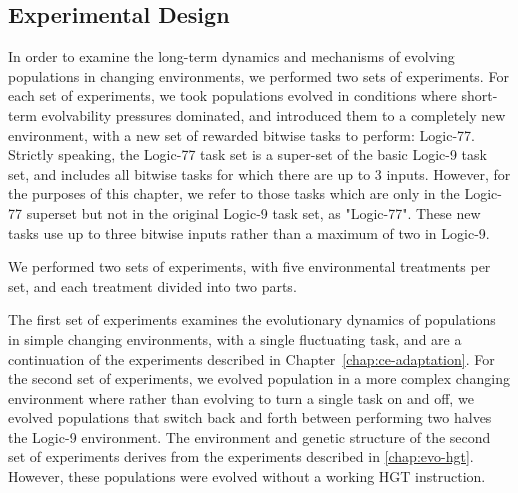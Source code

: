 \documentclass[PhD]{msu-thesis}
\begin{document}
\subsection{Experimental Design}
In order to examine the long-term dynamics and mechanisms of evolving populations in changing environments, we performed two sets of experiments. For each set of experiments, we took populations evolved in conditions where short-term evolvability pressures dominated, and introduced them to a completely new environment, with a new set of rewarded bitwise tasks to perform: Logic-77. Strictly speaking, the Logic-77 task set is a super-set of the basic Logic-9 task set, and includes all bitwise tasks for which there are up to 3 inputs. However, for the purposes of this chapter, we refer to those tasks which are only in the Logic-77 superset but not in the original Logic-9 task set, as "Logic-77".
These new tasks use up to three bitwise inputs rather than a maximum of two in Logic-9.


We performed two sets of experiments, with five environmental treatments per set, and each treatment divided into two parts.

The first set of experiments examines the evolutionary dynamics of populations in simple changing environments, with a single fluctuating task, and are a continuation of the experiments described in Chapter~\ref{chap:ce-adaptation}. For the second set of experiments, we evolved population in a more complex changing environment where rather than evolving to turn a single task on and off, we evolved populations that switch back and forth between performing two halves the Logic-9 environment. The environment and genetic structure of the second set of experiments derives from the experiments described in \ref{chap:evo-hgt}. However, these populations were evolved without a working HGT instruction.
\end{document}
